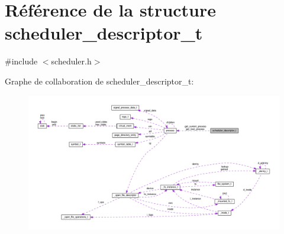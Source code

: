 \hypertarget{structscheduler__descriptor__t}{\section{Référence de la structure scheduler\+\_\+descriptor\+\_\+t}
\label{structscheduler__descriptor__t}
}


{\ttfamily \#include $<$scheduler.\+h$>$}



Graphe de collaboration de scheduler\+\_\+descriptor\+\_\+t\+:
\nopagebreak
\begin{figure}[H]
\begin{center}
\leavevmode
\includegraphics[width=350pt]{structscheduler__descriptor__t__coll__graph}
\end{center}
\end{figure}
